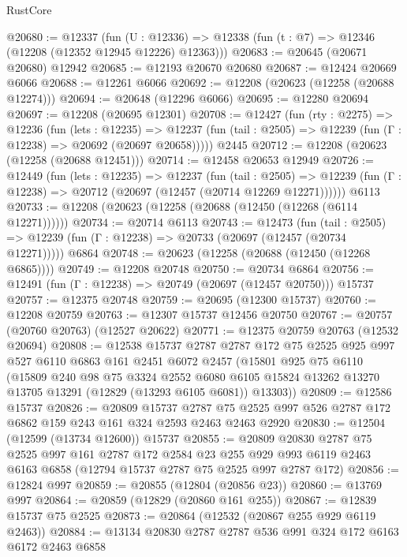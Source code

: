 \begin{lexlean}{RustCore}
\begin{coremodule}
@20680 := @12337
    (fun (U : @12336) => @12338 (fun (t : @7) => @12346 (@12208 (@12352 @12945 @12226) @12363)))
@20683 := @20645 (@20671 @20680) @12942
@20685 := @12193 @20670 @20680
@20687 := @12424 @20669 @6066
@20688 := @12261 @6066
@20692 := @12208 (@20623 (@12258 (@20688 @12274)))
@20694 := @20648 (@12296 @6066)
@20695 := @12280 @20694
@20697 := @12208 (@20695 @12301)
@20708 := @12427
    (fun (rty : @2275) =>
    @12236
      (fun (lets : @12235) =>
      @12237 (fun (tail : @2505) => @12239 (fun (Γ : @12238) => @20692 (@20697 @20658)))))
    @2445
@20712 := @12208 (@20623 (@12258 (@20688 @12451)))
@20714 := @12458 @20653 @12949
@20726 := @12449
    (fun (lets : @12235) =>
    @12237
      (fun (tail : @2505) =>
      @12239 (fun (Γ : @12238) => @20712 (@20697 (@12457 (@20714 @12269 @12271))))))
    @6113
@20733 := @12208 (@20623 (@12258 (@20688 (@12450 (@12268 (@6114 @12271))))))
@20734 := @20714 @6113
@20743 := @12473
    (fun (tail : @2505) => @12239 (fun (Γ : @12238) => @20733 (@20697 (@12457 (@20734 @12271)))))
    @6864
@20748 := @20623 (@12258 (@20688 (@12450 (@12268 @6865))))
@20749 := @12208 @20748
@20750 := @20734 @6864
@20756 := @12491 (fun (Γ : @12238) => @20749 (@20697 (@12457 @20750))) @15737
@20757 := @12375 @20748
@20759 := @20695 (@12300 @15737)
@20760 := @12208 @20759
@20763 := @12307 @15737 @12456 @20750
@20767 := @20757 (@20760 @20763) (@12527 @20622)
@20771 := @12375 @20759 @20763 (@12532 @20694)
@20808 := @12538
    @15737
    @2787
    @2787
    @172
    @75
    @2525
    @925
    @997
    @527
    @6110
    @6863
    @161
    @2451
    @6072
    @2457
    (@15801
      @925
      @75
      @6110
      (@15809
        @240
        @98
        @75
        @3324
        @2552
        @6080
        @6105
        @15824
        @13262
        @13270
        @13705
        @13291
        (@12829 (@13293 @6105 @6081))
        @13303))
@20809 := @12586 @15737
@20826 := @20809
    @15737
    @2787
    @75
    @2525
    @997
    @526
    @2787
    @172
    @6862
    @159
    @243
    @161
    @324
    @2593
    @2463
    @2463
    @2920
@20830 := @12504 (@12599 (@13734 @12600)) @15737
@20855 := @20809
    @20830
    @2787
    @75
    @2525
    @997
    @161
    @2787
    @172
    @2584
    @23
    @255
    @929
    @993
    @6119
    @2463
    @6163
    @6858
    (@12794 @15737 @2787 @75 @2525 @997 @2787 @172)
@20856 := @12824 @997
@20859 := @20855 (@12804 (@20856 @23))
@20860 := @13769 @997
@20864 := @20859 (@12829 (@20860 @161 @255))
@20867 := @12839 @15737 @75 @2525
@20873 := @20864 (@12532 (@20867 @255 @929 @6119 @2463))
@20884 := @13134 @20830 @2787 @2787 @536 @991 @324 @172 @6163 @6172 @2463 @6858

\end{coremodule}
\end{lexlean}
